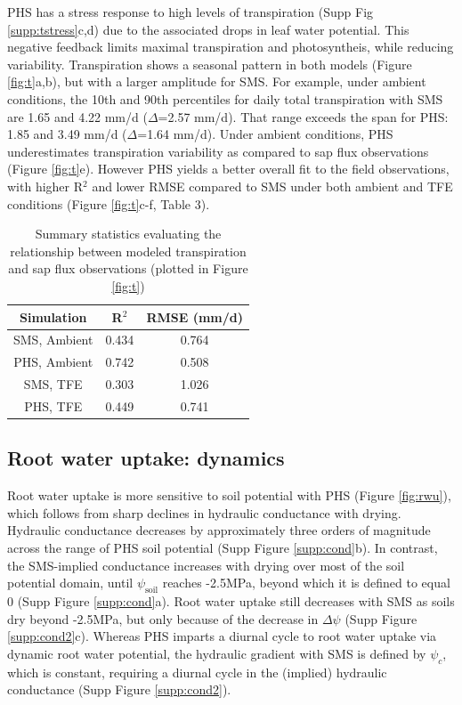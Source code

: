 \documentclass[draft,linenumbers]{agujournal}
\begin{document}
    PHS has a stress response to high levels of transpiration (Supp Fig \ref{supp:tstress}c,d) due to the associated drops in leaf water potential.
    This negative feedback limits maximal transpiration and photosyntheis, while reducing variability.  
    Transpiration shows a seasonal pattern in both models (Figure \ref{fig:t}a,b), but with a larger amplitude for SMS.
    For example, under ambient conditions, the 10th and 90th percentiles for daily total transpiration with SMS are 1.65 and 4.22 mm/d ($\Delta$=2.57 mm/d).
    That range exceeds the span for PHS: 1.85 and 3.49 mm/d ($\Delta$=1.64 mm/d).
    Under ambient conditions, PHS underestimates transpiration variability as compared to sap flux observations (Figure \ref{fig:t}e).
    However PHS yields a better overall fit to the field observations, with higher R$^2$  and lower RMSE compared to SMS 
    under both ambient and TFE conditions (Figure \ref{fig:t}c-f, Table 3).
    
    \begin{table}[h]
\caption{Summary statistics evaluating the relationship between modeled transpiration and sap flux observations (plotted in Figure \ref{fig:t})}
\label{tab:sapflux}
\centering
\begin{tabular}{c c c }
Simulation & R$^2$ & RMSE (mm/d) \\
\hline
SMS, Ambient & 0.434 & 0.764 \\
PHS, Ambient & 0.742 & 0.508 \\
SMS, TFE & 0.303 & 1.026 \\
PHS, TFE & 0.449 & 0.741 \\
\hline
\end{tabular}
\end{table}

    
\subsection{Root water uptake: dynamics}
    Root water uptake is more sensitive to soil potential with PHS (Figure \ref{fig:rwu}),
    which follows from sharp declines in hydraulic conductance with drying.
    Hydraulic conductance decreases by approximately three orders of magnitude across the range of PHS soil potential (Supp Figure \ref{supp:cond}b).
    In contrast, the SMS-implied conductance increases with drying over most of the soil potential domain, until $\psi_{\text{soil}}$ reaches -2.5MPa, beyond which it is defined to equal 0 (Supp Figure \ref{supp:cond}a).
    Root water uptake still decreases with SMS as soils dry beyond -2.5MPa, but only because of the decrease in $\Delta\psi$ (Supp Figure \ref{supp:cond2}c).
    Whereas PHS imparts a diurnal cycle to root water uptake via dynamic root water potential, 
    the hydraulic gradient with SMS is defined by $\psi_c$, which is constant, requiring a diurnal cycle in the (implied) hydraulic conductance (Supp Figure \ref{supp:cond2}).
    
\end{document}
